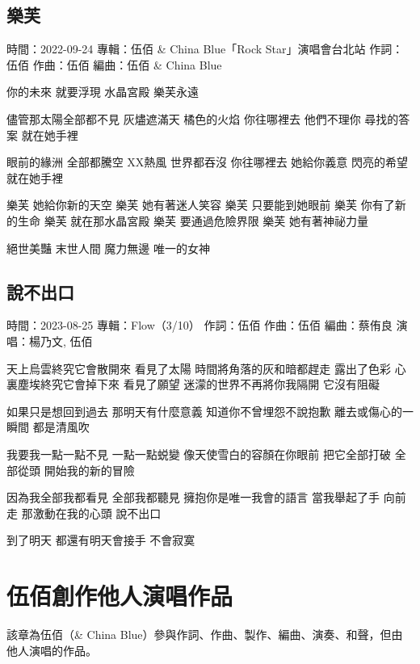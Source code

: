\documentclass[UTF8,a4paper,oneside,twocolumn,12pt]{ctexbook}
\newcommand{\infopair}[2]{\textbullet #1：#2}
\newcommand{\zc}[1][伍佰]{\infopair{作詞}{#1}}
\newcommand{\zq}[1][伍佰]{\infopair{作曲}{#1}}
\newcommand{\bq}[1][伍佰]{\infopair{編曲}{#1}}
\newcommand{\zj}[1]{\infopair{專輯}{#1}}
\newcommand{\sj}[1]{\infopair{時間}{#1}}
\newenvironment{info}{\begin{flushleft}\kaishu
	}
	{\end{flushleft}\normalsize\yahei\par}
\newenvironment{lyric}{
	}
{}
\begin{document}
\section{樂芙}%
\begin{info}
	\sj{2022-09-24}
	\zj{伍佰 \& China Blue「Rock Star」演唱會台北站}
	\zc
	\zq
	\bq[伍佰 \& China Blue]
\end{info}
\begin{lyric}%
	你的未來 就要浮現 水晶宮殿 樂芙永遠

	儘管那太陽全部都不見 灰燼遮滿天 橘色的火焰
	你往哪裡去 他們不理你 尋找的答案 就在她手裡

	眼前的緣洲 全部都騰空 XX熱風 世界都吞沒
	你往哪裡去 她給你義意 閃亮的希望 就在她手裡

	樂芙 她給你新的天空 樂芙 她有著迷人笑容
	樂芙 只要能到她眼前 樂芙 你有了新的生命
	樂芙 就在那水晶宮殿 樂芙 要通過危險界限
	樂芙 她有著神祕力量

	絕世美豔 末世人間 魔力無邊 唯一的女神
\end{lyric}

\section{說不出口}
\begin{info}
	\sj{2023-08-25}
	\zj{Flow（3/10）}
	\zc
	\zq
	\bq[蔡侑良]
	\infopair{演唱}{楊乃文, 伍佰}
\end{info}
\begin{lyric}%
	天上烏雲終究它會散開來 看見了太陽
	時間將角落的灰和暗都趕走 露出了色彩
	心裏塵埃終究它會掉下來 看見了願望
	迷濛的世界不再將你我隔開 它沒有阻礙

	如果只是想回到過去 那明天有什麼意義
	知道你不曾埋怨不說抱歉 離去或傷心的一瞬間
	都是清風吹

	我要我一點一點不見 一點一點蜕變
	像天使雪白的容顏在你眼前
	把它全部打破 全部從頭
	開始我的新的冒險

	因為我全部我都看見 全部我都聽見
	擁抱你是唯一我會的語言
	當我舉起了手 向前走
	那激動在我的心頭 說不出口

	到了明天 都還有明天會接手
	不會寂寞
\end{lyric}

\chapter{伍佰創作他人演唱作品}
該章為伍佰（\& China Blue）參與作詞、作曲、製作、編曲、演奏、和聲，但由他人演唱的作品。
\end{document}
